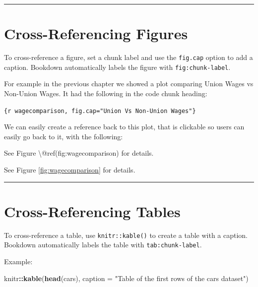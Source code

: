 \documentclass[
]{book}
\newenvironment{Shaded}{\begin{snugshade}}{\end{snugshade}}
\newcommand{\AttributeTok}[1]{\textcolor[rgb]{0.13,0.29,0.53}{#1}}
\newcommand{\FunctionTok}[1]{\textcolor[rgb]{0.13,0.29,0.53}{\textbf{#1}}}
\newcommand{\NormalTok}[1]{#1}
\newcommand{\SpecialCharTok}[1]{\textcolor[rgb]{0.81,0.36,0.00}{\textbf{#1}}}
\newcommand{\StringTok}[1]{\textcolor[rgb]{0.31,0.60,0.02}{#1}}
\theoremstyle{definition}
\theoremstyle{definition}
\theoremstyle{definition}
\theoremstyle{definition}
\theoremstyle{remark}
\begin{document}
\begin{center}\rule{0.5\linewidth}{0.5pt}\end{center}

\section{Cross-Referencing Figures}\label{cross-referencing-figures}

To cross-reference a figure, set a chunk label and use the \texttt{fig.cap} option to add a caption. Bookdown automatically labels the figure with \texttt{fig:chunk-label}.

For example in the previous chapter we showed a plot comparing Union Wages vs Non-Union Wages. It had the following in the code chunk heading:

\texttt{\{r\ wagecomparison,\ fig.cap="Union\ Vs\ Non-Union\ Wages"\}}

We can easily create a reference back to this plot, that is clickable so users can easily go back to it, with the following:

\begin{Shaded}
\begin{Highlighting}[]
\NormalTok{See Figure \textbackslash{}@ref(fig:wagecomparison) for details.}
\end{Highlighting}
\end{Shaded}

See Figure \ref{fig:wagecomparison} for details.

\begin{center}\rule{0.5\linewidth}{0.5pt}\end{center}

\section{Cross-Referencing Tables}\label{cross-referencing-tables}

To cross-reference a table, use \texttt{knitr::kable()} to create a table with a caption. Bookdown automatically labels the table with \texttt{tab:chunk-label}.

Example:

\begin{Shaded}
\begin{Highlighting}[]
\NormalTok{knitr}\SpecialCharTok{::}\FunctionTok{kable}\NormalTok{(}\FunctionTok{head}\NormalTok{(cars), }\AttributeTok{caption =} \StringTok{"Table of the first rows of the cars dataset"}\NormalTok{)}
\end{Highlighting}
\end{Shaded}
\end{document}
